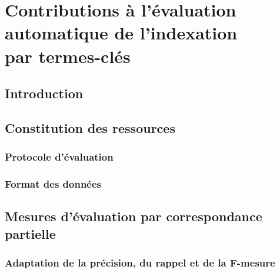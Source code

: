 \chapter[Contributions à l'évaluation automatique de l'indexation par termes-clés]{Contributions à l'évaluation automatique de l'indexation\\par termes-clés}
\label{chap:main-automatic_evaluation_of_keyphrase_annotation}

  \section{Introduction}
  \label{sec:main-automatic_evaluation_of_keyphrase_annotation-introduction}


  \section{Constitution des ressources}
  \label{section:main-automatic_evaluation_of_keyphrase_annotation-resource_construction}
    \subsection{Protocole d'évaluation}
    \label{subsec:main-automatic_evaluation_of_keyphrase_annotation-resource_construction-evaluation_protocol}

    \subsection{Format des données}
    \label{subsec:main-automatic_evaluation_of_keyphrase_annotation-resource_construction-data_format}


  \section{Mesures d'évaluation par correspondance partielle}
  \label{sec:main-automatic_evaluation_of_keyphrase_annotation-evaluation}
    \subsection{Adaptation de la précision, du rappel et de la F-mesure}
    \label{subsec:main-automatic_evaluation_of_keyphrase_annotation-contributions-evaluation-soft_maching_precision_recall_and_f_measure}

